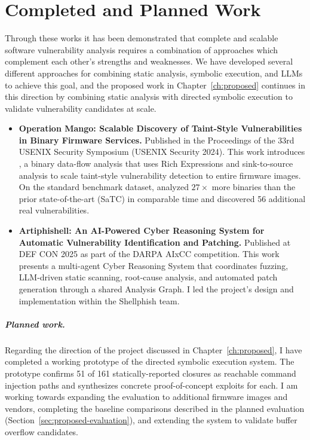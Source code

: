 \chapter{Completed and Planned Work}
\label{ch:completed-planned}

Through these works it has been demonstrated that complete and scalable software vulnerability analysis requires a combination of approaches which complement each other's strengths and weaknesses.
We have developed several different approaches for combining static analysis, symbolic execution, and LLMs to achieve this goal, and the proposed work in Chapter~\ref{ch:proposed} continues in this direction by combining static analysis with directed symbolic execution to validate vulnerability candidates at scale. 

\begin{itemize}
  \item \textbf{Operation Mango: Scalable Discovery of Taint-Style Vulnerabilities in Binary Firmware Services.}
  Published in the Proceedings of the 33rd USENIX Security Symposium (USENIX Security 2024).
  This work introduces \rda, a binary data-flow analysis that uses Rich Expressions and sink-to-source analysis to scale taint-style vulnerability detection to entire firmware images.
  On the standard benchmark dataset, \mango analyzed $27\times$ more binaries than the prior state-of-the-art (SaTC) in comparable time and discovered 56 additional real vulnerabilities.

  \item \textbf{Artiphishell: An AI-Powered Cyber Reasoning System for Automatic Vulnerability Identification and Patching.}
  Published at DEF CON 2025 as part of the DARPA AIxCC competition.
  This work presents a multi-agent Cyber Reasoning System that coordinates fuzzing, LLM-driven static scanning, root-cause analysis, and automated patch generation through a shared Analysis Graph.
  I led the project's design and implementation within the Shellphish team.
\end{itemize}

\paragraph{Planned work.} Regarding the direction of the project discussed in Chapter~\ref{ch:proposed}, I have completed a working prototype of the directed symbolic execution system.
The prototype confirms 51 of 161 statically-reported closures as reachable command injection paths and synthesizes concrete proof-of-concept exploits for each.
I am working towards expanding the evaluation to additional firmware images and vendors, completing the baseline comparisons described in the planned evaluation (Section~\ref{sec:proposed-evaluation}), and extending the system to validate buffer overflow candidates.
